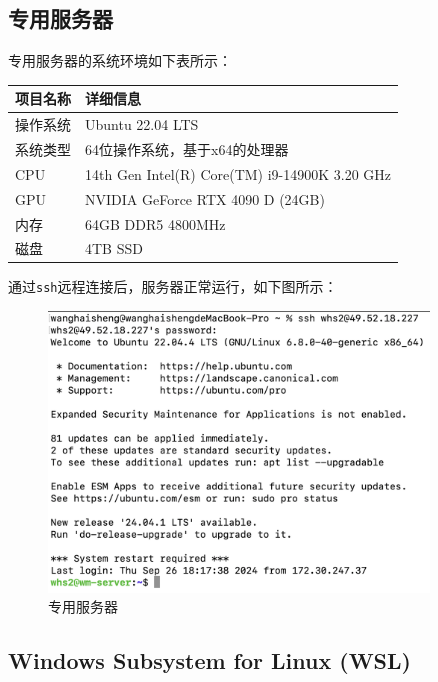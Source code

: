 \documentclass{article}
\begin{document}
\subsection{专用服务器}

专用服务器的系统环境如下表所示：

\begin{center}
	\begin{tabular}{| >{\centering\arraybackslash}m{3cm} | >{\centering\arraybackslash}m{9cm} |}    
		\hline  
		\textbf{项目名称} & \textbf{详细信息} \\
		\hline  
		操作系统 & Ubuntu 22.04 LTS \\  
		\hline  
		系统类型 & 64位操作系统，基于x64的处理器 \\  
		\hline
		CPU & 14th Gen Intel(R) Core(TM) i9-14900K 3.20 GHz \\  
		\hline 
		GPU & NVIDIA GeForce RTX 4090 D (24GB)\\  
		\hline 
		内存 & 64GB DDR5 4800MHz \\  
		\hline 
		磁盘 & 4TB SSD \\  
		\hline 		
	\end{tabular}
\end{center}

通过\texttt{ssh}远程连接后，服务器正常运行，如下图所示：

\begin{figure}[H]
	\centering
	\includegraphics[width=0.9\textwidth]{img/server_init.png}
	\caption{专用服务器}
\end{figure}

\subsection{Windows Subsystem for Linux (WSL)}
\end{document}
